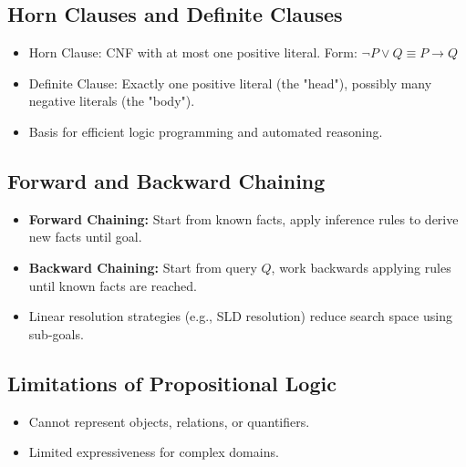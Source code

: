 \subsection{Horn Clauses and Definite Clauses}
\begin{itemize}
    \item Horn Clause: CNF with at most one positive literal.  
      Form: $\neg P \lor Q \equiv P \rightarrow Q$
    \item Definite Clause: Exactly one positive literal (the "head"), possibly many negative literals (the "body").
    \item Basis for efficient logic programming and automated reasoning.
\end{itemize}

\subsection{Forward and Backward Chaining}
\begin{itemize}
    \item \textbf{Forward Chaining:} Start from known facts, apply inference rules to derive new facts until goal.
    \item \textbf{Backward Chaining:} Start from query $Q$, work backwards applying rules until known facts are reached.
    \item Linear resolution strategies (e.g., SLD resolution) reduce search space using sub-goals.
\end{itemize}

\subsection{Limitations of Propositional Logic}
\begin{itemize}
    \item Cannot represent objects, relations, or quantifiers.
    \item Limited expressiveness for complex domains.
\end{itemize}

